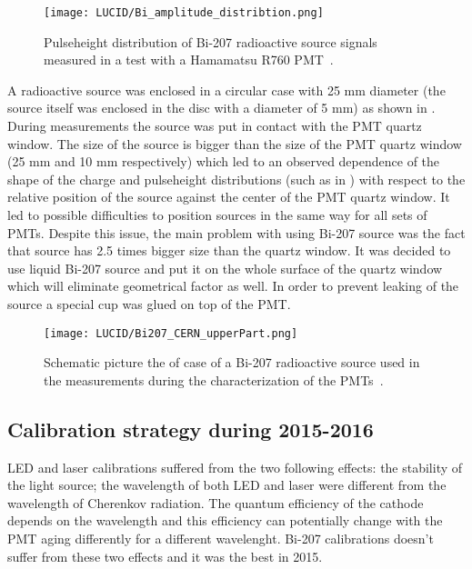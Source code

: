 \begin{figure}
\centering
\texttt{[image: LUCID/Bi\_amplitude\_distribtion.png]}
\caption{Pulseheight distribution of Bi-207 radioactive source signals measured in a test with a Hamamatsu R760 PMT~\cite{Alberghi:2016tad}.}
\label{fig:pulseheight_Bi207}
\end{figure}

A radioactive source was enclosed in a circular case with 25 mm diameter 
(the source itself was enclosed in the disc with a diameter of 5 mm) as shown in .
During measurements the source was put in contact with the PMT quartz window.
The size of the source is bigger than the size of the PMT quartz window (25 mm and 10 mm respectively) which led to an observed dependence of the shape of the charge and pulseheight distributions (such as in ) with respect to the relative position of the source against the center of the PMT quartz window.
It led to possible difficulties to position sources in the same way for all sets of PMTs.
Despite this issue, the main problem with using Bi-207 source was the fact that source has 2.5 times bigger size than the quartz window.
It was decided to use liquid Bi-207 source and put it on the whole surface of the quartz window which will eliminate geometrical factor as well.
In order to prevent leaking of the source a special cup was glued on top of the PMT.
 
\begin{figure}
\centering
\texttt{[image: LUCID/Bi207\_CERN\_upperPart.png]}
\caption{Schematic picture the of case of a Bi-207 radioactive source used in the measurements during the characterization of the PMTs~\cite{Alberghi:2016tad}.}
\label{fig:Bi207_case}
\end{figure}

\subsection{Calibration strategy during 2015-2016}
\label{subsec:calibPerformance}

LED and laser calibrations suffered from the two following effects:
the stability of the light source; the wavelength of both LED and laser were different from the wavelength of Cherenkov radiation. 
The quantum efficiency of the cathode depends on the wavelength and this efficiency can potentially change with the PMT aging
differently for a different wavelenght.
Bi-207 calibrations doesn't suffer from these two effects and it was the best in 2015.

